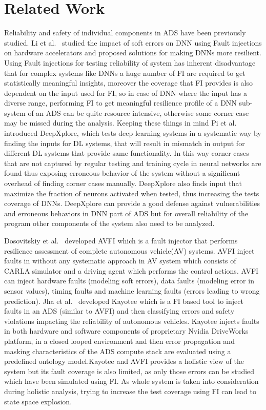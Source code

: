 \section{Related Work} 

Reliability and safety of individual components in ADS have been previously studied. Li et al.~\cite{guanpeng17sc} studied the impact of soft errors on DNN using Fault injections on hardware accelerators and proposed solutions for making DNNs more resilient. Using Fault injections for testing reliability of system has inherent disadvantage that for complex systems like DNNs a huge number of FI are required to get statistically meaningful insights, moreover the coverage that FI provides is also dependent on the input used for FI, so in case of DNN where the input has a diverse range, performing FI to get meaningful resilience profile of a DNN sub-system of an ADS can be quite resource intensive, otherwise some corner case may be missed during the analysis. Keeping these things in mind Pi et al.~\cite{kexin17sosp} introduced DeepXplore, which tests deep learning systems in a systematic way by finding the inputs for DL systems, that will result in mismatch in output for different DL systems that provide same functionality. In this way corner cases that are not captured by regular testing and training cycle in neural networks are found thus exposing erroneous behavior of the system without a significant overhead of finding corner cases manually. DeepXplore also finds input that maximize the fraction of neurons activated when tested, thus increasing the tests coverage of DNNs. DeepXplore can provide a good defense against vulnerabilities and erroneous behaviors in DNN part of ADS but for overall reliability of the program other components of the system also need to be analyzed.

Dosovitskiy et al.~\cite{Dosovitskiy17} developed AVFI which is a fault injector that performs resilience assessment of complete autonomous vehicle(AV) systems. AVFI inject faults in without any systematic approach in AV system which consists of CARLA simulator and a driving agent which performs the control actions. AVFI can inject hardware faults (modeling soft errors), data faults (modeling error in sensor values), timing faults and machine learning faults (errors leading to wrong prediction). Jha et al.~\cite{jha18art} developed Kayotee which is a FI based tool to inject faults in an ADS (similar to AVFI) and then classifying errors and safety violations impacting the reliability of autonomous vehicles. Kayotee injects faults in both hardware and software components of proprietary Nvidia DriveWorks platform, in a closed looped environment and then error propagation and masking characteristics of the ADS compute stack are evaluated using a predefined ontology model.Kayotee and AVFI provides a holistic view of the system but its  fault coverage is also limited, as only those errors can be studied which have been simulated using FI. As whole system is taken into consideration during holistic analysis, trying to increase the test coverage using FI can lead to state space explosion.  
